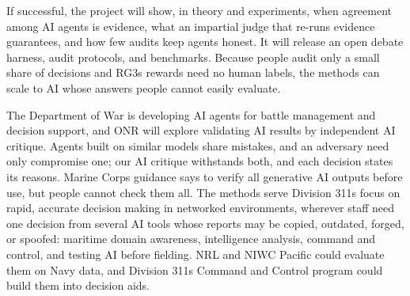 \documentclass[12pt,letterpaper]{article}
\begin{document}
If successful, the project will show, in theory and experiments, when agreement among AI agents is evidence, what an impartial judge that re-runs evidence guarantees, and how few audits keep agents honest. It will release an open debate harness, audit protocols, and benchmarks. Because people audit only a small share of decisions and RG3\textquotesingle{}s rewards need no human labels, the methods can scale to AI whose answers people cannot easily evaluate.

The Department of War is developing AI agents for battle management and decision support, and ONR will explore validating AI results by independent AI critique. Agents built on similar models share mistakes, and an adversary need only compromise one; our AI critique withstands both, and each decision states its reasons. Marine Corps guidance says to verify all generative AI outputs before use, but people cannot check them all. The methods serve Division 311\textquotesingle{}s focus on rapid, accurate decision making in networked environments, wherever staff need one decision from several AI tools whose reports may be copied, outdated, forged, or spoofed: maritime domain awareness, intelligence analysis, command and control, and testing AI before fielding. NRL and NIWC Pacific could evaluate them on Navy data, and Division 311\textquotesingle{}s Command and Control program could build them into decision aids.
\end{document}
